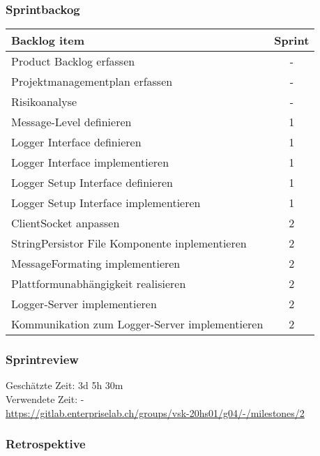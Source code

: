 \subsubsection{Sprintbackog}
	\begin{tabularx}{\textwidth}{|p{}|c|}
		\hline
		\textbf{Backlog item} & \textbf{Sprint} \\
		\hline
		Product Backlog erfassen & - \\
		\hline
		Projektmanagementplan erfassen & - \\
		\hline
		Risikoanalyse & - \\
		\hline
		Message-Level definieren & 1
\\
		\hline
		Logger Interface definieren & 1 \\
		\hline
		Logger Interface implementieren & 1
\\
		\hline
		Logger Setup Interface definieren & 1
\\
		\hline
		Logger Setup Interface implementieren & 1
\\
		\hline
		ClientSocket anpassen & 2\\ 
		\hline
		StringPersistor File Komponente inplementieren & 2 \\
		\hline
		MessageFormating implementieren & 2 \\
		\hline
		Plattformunabhängigkeit realisieren & 2 \\
		\hline
		Logger-Server implementieren & 2 \\
		\hline
		Kommunikation zum Logger-Server implementieren & 2 \\
		\hline
	\end{tabularx}
\subsubsection{Sprintreview}
Geschätzte Zeit: 3d 5h 30m\\ 
Verwendete Zeit: -
\\
\url{https://gitlab.enterpriselab.ch/groups/vsk-20hs01/g04/-/milestones/2}

\subsubsection{Retrospektive}